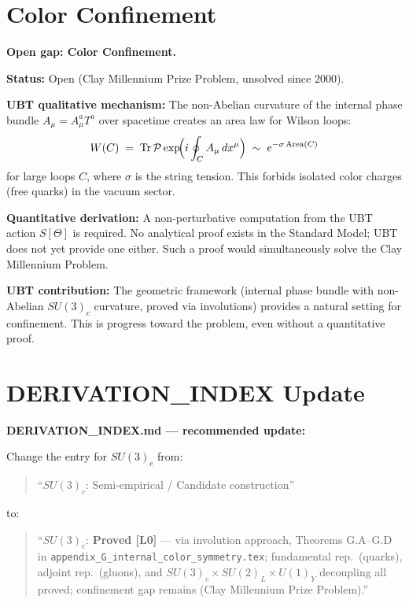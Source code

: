 \documentclass[12pt,a4paper]{article}
\theoremstyle{definition}
\theoremstyle{remark}
\begin{document}
\section{Color Confinement}
\label{sec:confinement}

\begin{gapbox}
\textbf{Open gap: Color Confinement.}

\textbf{Status:} Open (Clay Millennium Prize Problem, unsolved since 2000).

\textbf{UBT qualitative mechanism:}
The non-Abelian curvature of the internal phase bundle $A_\mu = A_\mu^a T^a$
over spacetime creates an area law for Wilson loops:
\begin{equation}
  W(C) \;=\; \mathrm{Tr}\,\mathcal{P}\exp\!\Bigl(i\oint_C A_\mu\,dx^\mu\Bigr)
  \;\sim\; e^{-\sigma\,\mathrm{Area}(C)}
\end{equation}
for large loops $C$, where $\sigma$ is the string tension.  This forbids
isolated color charges (free quarks) in the vacuum sector.

\textbf{Quantitative derivation:}
A non-perturbative computation from the UBT action $S[\Theta]$ is required.
No analytical proof exists in the Standard Model; UBT does not yet provide
one either.  Such a proof would simultaneously solve the Clay Millennium Problem.

\textbf{UBT contribution:} The geometric framework (internal phase bundle with
non-Abelian $SU(3)_c$ curvature, proved via involutions) provides a natural
setting for confinement.  This is progress toward the problem, even without
a quantitative proof.
\end{gapbox}

\section{DERIVATION\_INDEX Update}
\label{sec:index}

\begin{insightbox}
\textbf{DERIVATION\_INDEX.md --- recommended update:}

Change the entry for $SU(3)_c$ from:
\begin{quote}
``$SU(3)_c$: Semi-empirical / Candidate construction''
\end{quote}
to:
\begin{quote}
``$SU(3)_c$: \textbf{Proved [L0]} --- via involution approach,
Theorems G.A--G.D in \texttt{appendix\_G\_internal\_color\_symmetry.tex};
fundamental rep.\ (quarks), adjoint rep.\ (gluons), and
$SU(3)_c \times SU(2)_L \times U(1)_Y$ decoupling all proved;
confinement gap remains (Clay Millennium Prize Problem).''
\end{quote}
\end{insightbox}
\end{document}
